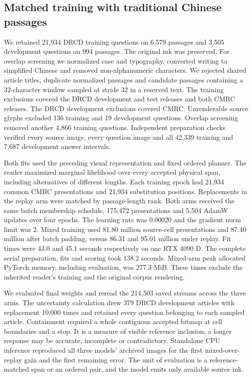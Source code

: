 \subsection*{Matched training with traditional Chinese passages}
We retained 21,934 DRCD training questions on 6,579 passages and 3,505 development questions on 994 passages. The original ink was preserved. For overlap screening we normalized case and typography, converted writing to simplified Chinese and removed non-alphanumeric characters. We rejected shared article titles, duplicate normalized passages and candidate passages containing a 32-character window sampled at stride 32 in a reserved text. The training exclusions covered the DRCD development and test releases and both CMRC releases. The DRCD development exclusions covered CMRC. Unrenderable source glyphs excluded 136 training and 19 development questions. Overlap screening removed another 4,866 training questions. Independent preparation checks verified every source image, every question image and all 42,339 training and 7,687 development answer intervals.

Both fits used the preceding visual representation and fixed ordered planner. The reader maximized marginal likelihood over every accepted physical span, including alternatives of different lengths. Each training epoch had 21,934 common CMRC presentations and 21,934 substitution positions. Replacements in the replay arm were matched by passage-length rank. Both arms received the same batch membership schedule, 175,472 presentations and 5,504 AdamW updates over four epochs. The learning rate was 0.00020 and the gradient norm limit was 2. Mixed training used 81.80 million source-cell presentations and 87.40 million after batch padding, versus 86.31 and 95.01 million under replay. Fit times were 43.0 and 45.1 seconds respectively on one RTX 4090 D. The complete serial preparation, fits and scoring took 138.2 seconds. Mixed-arm peak allocated PyTorch memory, including evaluation, was 277.3 MiB. These times exclude the inherited reader's training and the original corpus rendering.

We evaluated final weights and reread the 214,503 saved streams across the three arms. The uncertainty calculation drew 379 DRCD development articles with replacement 10,000 times and retained every question belonging to each sampled article. Containment required a whole contiguous accepted bitmap at cell boundaries and a stop. It is a measure of visible reference inclusion; a longer response may be accurate, incomplete or contradictory. Standalone CPU inference reproduced all three models' archived images for the first mixed-over-replay gain and the first remaining error. The unit of evaluation is a reference-matched span or an ordered pair, and the model emits only available source ink.
